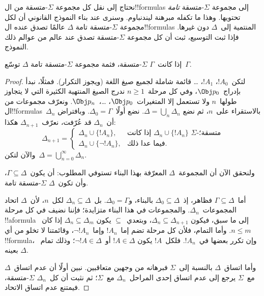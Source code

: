 \documentclass[../../../include/open-logic-section]{subfiles}
\begin{document}


نحتاج إلى نقل كل مجموعة $\Sigma$-متسقة من ال!!{formula}s إلى مجموعة
$\Sigma$-متسقة \emph{تامة} تحتويها. وهذا ما تكفله مبرهنة ليندنباوم.
وسنرى عند بناء النموذج القانوني أن لكل مجموعة $\Sigma$-متسقة تامة
$\Delta$ عالمًا تصدق عنده ال!!{formula}s المنتمية إلى~$\Delta$ دون غيرها.
فإذا ثبت التوسيع، ثبت أن كل مجموعة $\Sigma$-متسقة
تصدق عند عالم من عوالم ذلك النموذج.

\begin{thm}
  إذا كانت~$\Gamma$ $\Sigma$-متسقة، فثمة مجموعة $\Sigma$-متسقة تامة
  $\Delta$ توسّع~$\Gamma$.
\end{thm}

\begin{proof}
لتكن~$!A_0$، $!A_1$، \dots{} قائمة شاملة لجميع صيغ اللغة (ويجوز
التكرار). فمثلًا، نبدأ بإدراج~$\Obj p_0$، وفي كل مرحلة~$n \ge 1$
ندرج الصيغ المنتهية الكثيرة التي لا يتجاوز طولها~$n$ ولا تستعمل إلا
المتغيرات~$\Obj p_0$، \dots،~$\Obj p_n$. ونعرّف مجموعات من
ال!!{formula}s~$\Delta_n$ بالاستقراء على~$n$، ثم نضع
$\Delta = \bigcup_n \Delta_n$. نضع أولًا~$\Delta_0 = \Gamma$.
وبافتراض أن~$\Delta_n$ قد عُرّفت، نعرّف~$\Delta_{n+1}$ هكذا:
\[
\Delta_{n+1} =
\begin{cases}
  \Delta_n \cup \{!A_n\}, & \text{إذا كانت $\Delta_n \cup \{!A_n\}$
    $\Sigma$-متسقة؛} \\
  \Delta_n \cup \{\lnot !A_n\}, & \text{فيما عدا ذلك.}
\end{cases}
\]
والآن لتكن~$\Delta = \bigcup_{n=0}^\infty \Delta_n$.

ولنحقق الآن أن المجموعة~$\Delta$ المعرّفة بهذا البناء تستوفي المطلوب:
أن يكون~$\Gamma \subseteq \Delta$، وأن تكون~$\Delta$ $\Sigma$-متسقة تامة.

أما~$\Gamma \subseteq \Delta$ فظاهر، إذ~$\Delta_0 \subseteq
\Delta$ بالبناء، و$\Delta_0 = \Gamma$.
بل~$\Delta_n \subseteq \Delta$ لكل~$n$، لأن~$\Delta$ اتحاد المجموعات~$\Delta_n$.
والمجموعات في هذا البناء متزايدة؛ فإننا نضيف في كل مرحلة !!a{formula}
إلى ما سبق، فيكون $\Delta_n \subseteq \Delta_{n+1}$،
وبتعدي~$\subseteq$ يكون $\Delta_n \subseteq \Delta_m$ إذا كان~$n \le m$.
وأما التمام، فلأن كل مرحلة تضم إما~$!A_n$ وإما~$\lnot !A_n$،
وقائمتنا لا تخلو من أي !!{formula}، وإن تكرر بعضها في~$!A_n$.
فلكل~$!A$ يكون $!A \in \Delta$ أو~$\lnot !A \in \Delta$؛
وذلك تمام~$\Delta$ بعينه.

وأما اتساق~$\Delta$ بالنسبة إلى~$\Sigma$ فبرهانه من وجهين متعاقبين.
نبين أولًا أن عدم اتساق~$\Delta$ مع~$\Sigma$ يرجع إلى عدم اتساق
إحدى المراحل~$\Delta_n$ مع~$\Sigma$؛ ثم نثبت أن كل~$\Delta_n$
$\Sigma$-متسقة، فيمتنع عدم اتساق الاتحاد.


\end{proof}
\end{document}
